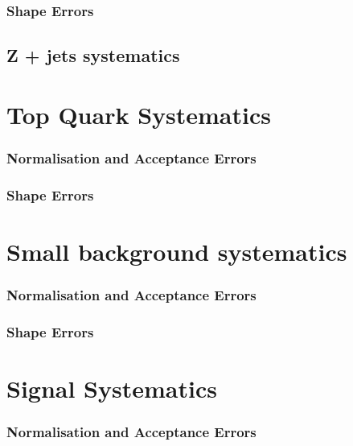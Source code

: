 \subsubsection{Shape Errors}

\subsection{Z + jets systematics}



\section{Top Quark Systematics}


\subsubsection{Normalisation and Acceptance Errors}

\subsubsection{Shape Errors}

\section{Small background systematics}


\subsubsection{Normalisation and Acceptance Errors}

\subsubsection{Shape Errors}

\section{Signal Systematics}


\subsubsection{Normalisation and Acceptance Errors}

